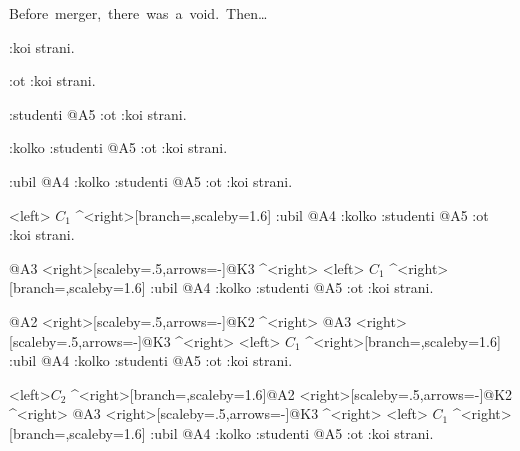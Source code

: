 

\def\broken{[branch=\brokenbranch,scaleby=1.6]}%
\def\stub{[scaleby=.5,arrows=-]}%
\def\\#1{\rput[bl](.6ex,.4ex){#1}}%
\def\BEGIN{\leavevmode\vfill \line\bgroup\hfill}
\def\END{\egroup\par\break}

\vsize=3in
\def\pstcommands{}

\BEGIN
\hbox{Before merger, there was a void.  Then\enspace \dots}
\END

\BEGIN\jtree\start
:{koi} {strani}.
\endjtree\END
\BEGIN\jtree\start
:{ot} :{koi} {strani}.
\endjtree\END

\BEGIN\jtree\start
:{studenti} {\omit}@A5
:{ot} :{koi} {strani}.
\endjtree\END

\BEGIN\jtree\start
:{kolko} {\omit}
:{studenti} {\omit}@A5
:{ot} :{koi} {strani}.
\endjtree\END

\BEGIN\jtree\start
:{ubil} {\omit}@A4
:{kolko} {\omit}
:{studenti} {\omit}@A5
:{ot} :{koi} {strani}.
\endjtree\END

\BEGIN\jtree\start
<left> {$C_1$}  ^<right>\broken
:{ubil} {\omit}@A4
:{kolko} {\omit}
:{studenti} {\omit}@A5
:{ot} :{koi} {strani}.
\endjtree\END

\BEGIN\jtree\start
{\omit}@A3
<right>\stub{\omit}@K3  ^<right>
<left> {$C_1$}  ^<right>\broken
:{ubil} {\omit}@A4
:{kolko} {\omit}
:{studenti} {\omit}@A5
:{ot} :{koi} {strani}.
\endjtree\END

\BEGIN\jtree\start
{\omit}@A2
<right>\stub{\omit}@K2  ^<right> {\omit}@A3
<right>\stub{\omit}@K3  ^<right>
<left> {$C_1$}  ^<right>\broken
:{ubil} {\omit}@A4
:{kolko} {\omit}
:{studenti} {\omit}@A5
:{ot} :{koi} {strani}.
\endjtree\END

\BEGIN\jtree\start
<left>{$C_2$}  ^<right>\broken{\omit}@A2
<right>\stub{\omit}@K2  ^<right> {\omit}@A3
<right>\stub{\omit}@K3  ^<right>
<left> {$C_1$}  ^<right>\broken
:{ubil} {\omit}@A4
:{kolko} {\omit}
:{studenti} {\omit}@A5
:{ot} :{koi} {strani}.
\endjtree\END


